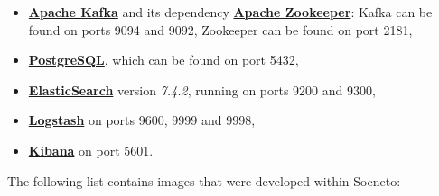 \documentclass{article}
\begin{document}
\begin{itemize}
    \item \textbf{\href{https://kafka.apache.org/}{Apache Kafka}} and its dependency \textbf{\href{https://zookeeper.apache.org/}{Apache Zookeeper}}: Kafka can be found on ports 9094 and 9092, Zookeeper can be found on port 2181,
    \item \textbf{\href{https://www.postgresql.org/}{PostgreSQL}}, which can be found on port 5432,
    \item \textbf{\href{https://www.elastic.co/}{ElasticSearch}}  version \textit{7.4.2}, running on ports 9200 and 9300,
    \item \textbf{\href{https://www.elastic.co/logstash}{Logstash}} on ports 9600, 9999 and 9998,
    \item \textbf{\href{https://www.elastic.co/kibana}{Kibana}} on port 5601.
\end{itemize}
The following list contains images that were developed within Socneto:
\end{document}
